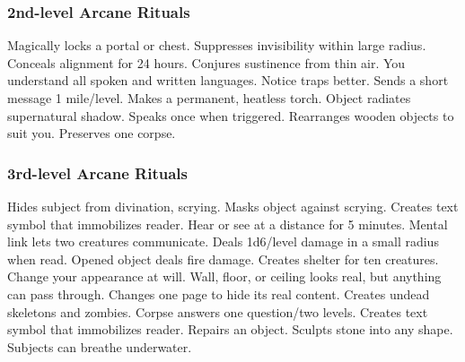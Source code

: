 \subsubsection{2nd-level Arcane Rituals}
\begin{rituallist}
     Magically locks a portal or chest.
     Suppresses invisibility within large radius.
     Conceals alignment for 24 hours.
     Conjures sustinence from thin air.
     You understand all spoken and written languages.
     Notice traps better.
     Sends a short message 1 mile/level.
     Makes a permanent, heatless torch.
     Object radiates supernatural shadow.
     Speaks once when triggered.
     Rearranges wooden objects to suit you.
     Preserves one corpse.
\end{rituallist}

\subsubsection{3rd-level Arcane Rituals}
\begin{rituallist}
     Hides subject from divination, scrying.
     Masks object against scrying.
     Creates text symbol that immobilizes reader.
     Hear or see at a distance for 5 minutes.
     Mental link lets two creatures communicate.
     Deals 1d6/level damage in a small radius when read.
     Opened object deals fire damage.
     Creates shelter for ten creatures.
     Change your appearance at will.
     Wall, floor, or ceiling looks real, but anything can pass through.
     Changes one page to hide its real content.
     Creates undead skeletons and zombies.
     Corpse answers one question/two levels.
     Creates text symbol that immobilizes reader.
     Repairs an object.
     Sculpts stone into any shape.
     Subjects can breathe underwater.
\end{rituallist}

